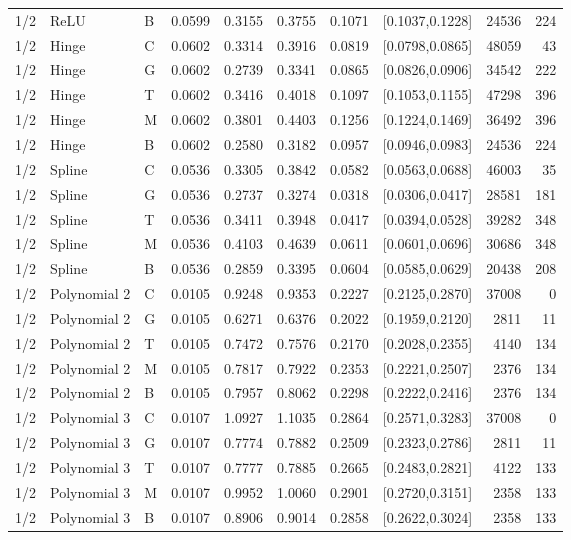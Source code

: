 \begin{longtable}{lllrrrrlrr}
1/2 & ReLU & B & 0.0599 & 0.3155 & 0.3755 & 0.1071 & [0.1037,0.1228] & 24536 & 224 \\
1/2 & Hinge & C & 0.0602 & 0.3314 & 0.3916 & 0.0819 & [0.0798,0.0865] & 48059 & 43 \\
1/2 & Hinge & G & 0.0602 & 0.2739 & 0.3341 & 0.0865 & [0.0826,0.0906] & 34542 & 222 \\
1/2 & Hinge & T & 0.0602 & 0.3416 & 0.4018 & 0.1097 & [0.1053,0.1155] & 47298 & 396 \\
1/2 & Hinge & M & 0.0602 & 0.3801 & 0.4403 & 0.1256 & [0.1224,0.1469] & 36492 & 396 \\
1/2 & Hinge & B & 0.0602 & 0.2580 & 0.3182 & 0.0957 & [0.0946,0.0983] & 24536 & 224 \\
1/2 & Spline & C & 0.0536 & 0.3305 & 0.3842 & 0.0582 & [0.0563,0.0688] & 46003 & 35 \\
1/2 & Spline & G & 0.0536 & 0.2737 & 0.3274 & 0.0318 & [0.0306,0.0417] & 28581 & 181 \\
1/2 & Spline & T & 0.0536 & 0.3411 & 0.3948 & 0.0417 & [0.0394,0.0528] & 39282 & 348 \\
1/2 & Spline & M & 0.0536 & 0.4103 & 0.4639 & 0.0611 & [0.0601,0.0696] & 30686 & 348 \\
1/2 & Spline & B & 0.0536 & 0.2859 & 0.3395 & 0.0604 & [0.0585,0.0629] & 20438 & 208 \\
1/2 & Polynomial 2 & C & 0.0105 & 0.9248 & 0.9353 & 0.2227 & [0.2125,0.2870] & 37008 & 0 \\
1/2 & Polynomial 2 & G & 0.0105 & 0.6271 & 0.6376 & 0.2022 & [0.1959,0.2120] & 2811 & 11 \\
1/2 & Polynomial 2 & T & 0.0105 & 0.7472 & 0.7576 & 0.2170 & [0.2028,0.2355] & 4140 & 134 \\
1/2 & Polynomial 2 & M & 0.0105 & 0.7817 & 0.7922 & 0.2353 & [0.2221,0.2507] & 2376 & 134 \\
1/2 & Polynomial 2 & B & 0.0105 & 0.7957 & 0.8062 & 0.2298 & [0.2222,0.2416] & 2376 & 134 \\
1/2 & Polynomial 3 & C & 0.0107 & 1.0927 & 1.1035 & 0.2864 & [0.2571,0.3283] & 37008 & 0 \\
1/2 & Polynomial 3 & G & 0.0107 & 0.7774 & 0.7882 & 0.2509 & [0.2323,0.2786] & 2811 & 11 \\
1/2 & Polynomial 3 & T & 0.0107 & 0.7777 & 0.7885 & 0.2665 & [0.2483,0.2821] & 4122 & 133 \\
1/2 & Polynomial 3 & M & 0.0107 & 0.9952 & 1.0060 & 0.2901 & [0.2720,0.3151] & 2358 & 133 \\
1/2 & Polynomial 3 & B & 0.0107 & 0.8906 & 0.9014 & 0.2858 & [0.2622,0.3024] & 2358 & 133 \\

\end{longtable}
